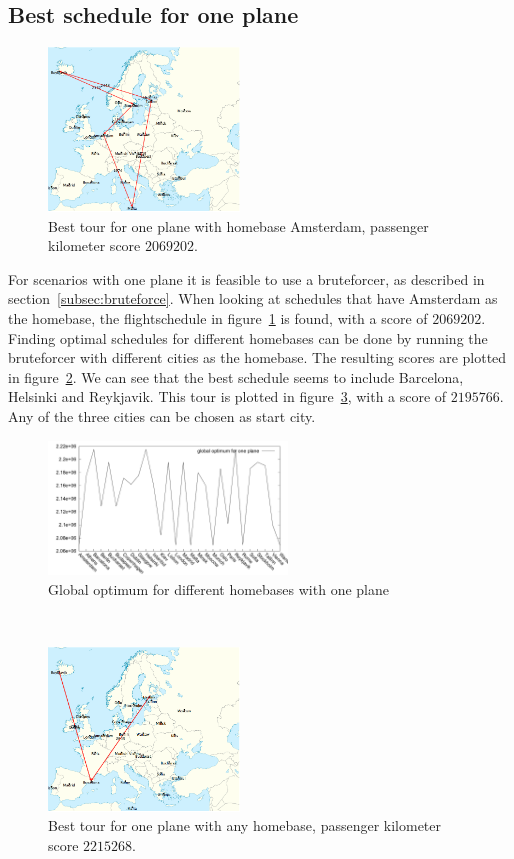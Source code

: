 \documentclass[journal]{IEEEtran}
\begin{document}
\subsection{Best schedule for one plane}
\begin{figure}[!h]
\centering
\includegraphics[width=2.0in]{best_tour_one_plane_amsterdam}
\caption{Best tour for one plane with homebase Amsterdam, passenger kilometer score $\num{2069202}$.}
\label{fig:one_plane_amsterdam}
\end{figure}
For scenarios with one plane it is feasible to use a bruteforcer, as described in section~\ref{subsec:bruteforce}. When looking at schedules that have Amsterdam as the homebase, the flightschedule in figure~\ref{fig:one_plane_amsterdam} is found, with a score of $\num{2069202}$. Finding optimal schedules for different homebases can be done by running the bruteforcer with different cities as the homebase. The resulting scores are plotted in figure~\ref{fig:different_homebase_one_plane}. We can see that the best schedule seems to include Barcelona, Helsinki and Reykjavik. This tour is plotted in figure~\ref{fig:one_plane}, with a score of $\num{2195766}$. Any of the three cities can be chosen as start city.
\\
\begin{figure}[!h]
\centering
\includegraphics[width=2.5in]{different_homebases_one_plane}
\caption{Global optimum for different homebases with one plane}
\label{fig:different_homebase_one_plane}
\end{figure}
\\
\begin{figure}[!h]
\centering
\includegraphics[width=2.0in]{best_tour_one_plane}
\caption{Best tour for one plane with any homebase, passenger kilometer score $\num{2215268}$.}
\label{fig:one_plane}
\end{figure}
\end{document}
